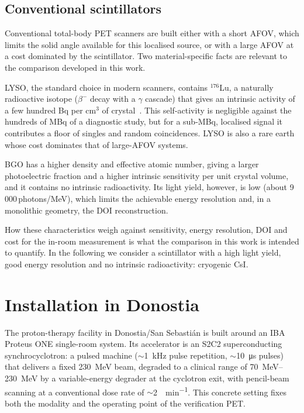 \documentclass{iopjournal}
\begin{document}
\subsection{Conventional scintillators}

Conventional total-body PET scanners are built either with a short AFOV, which
limits the solid angle available for this localised source, or with a large AFOV
at a cost dominated by the scintillator. Two material-specific facts are relevant
to the comparison developed in this work.

LYSO, the standard choice in modern scanners, contains $^{176}$Lu, a naturally
radioactive isotope ($\beta^{-}$ decay with a $\gamma$ cascade) that gives an
intrinsic activity of a few hundred Bq per cm$^{3}$ of
crystal~\cite{yamamoto2005investigation,conti2017physics}. This self-activity is
negligible against the hundreds of MBq of a diagnostic study, but for a sub-MBq,
localised signal it contributes a floor of singles and random coincidences. LYSO
is also a rare earth whose cost dominates that of large-AFOV systems.

BGO has a higher density and effective atomic number, giving a larger
photoelectric fraction and a higher intrinsic sensitivity per unit crystal
volume, and it contains no intrinsic radioactivity. Its light yield, however, is
low (about 9\,000\,photons/MeV), which limits the achievable energy resolution
and, in a monolithic geometry, the DOI reconstruction.

How these characteristics weigh against sensitivity, energy resolution, DOI and
cost for the in-room measurement is what the comparison in this work is intended
to quantify. In the following we consider a scintillator with a high light
yield, good energy resolution and no intrinsic radioactivity: cryogenic CsI.

\section{Installation in Donostia}
\label{sec:donostia}

The proton-therapy facility in Donostia/San Sebasti\'an is built around an IBA
Proteus ONE single-room system. Its accelerator is an S2C2 superconducting
synchrocyclotron: a pulsed machine ($\sim$\SI{1}{\kilo\hertz} pulse
repetition, $\sim$\SI{10}{\micro\second} pulses) that delivers a fixed
\SI{230}{\MeV} beam, degraded to a clinical range of \SIrange{70}{230}{\MeV} by
a variable-energy degrader at the cyclotron exit, with pencil-beam scanning at a
conventional dose rate of $\sim$\SI{2}{\Gy\per\minute}. This concrete setting fixes
both the modality and the operating point of the verification PET.
\end{document}
